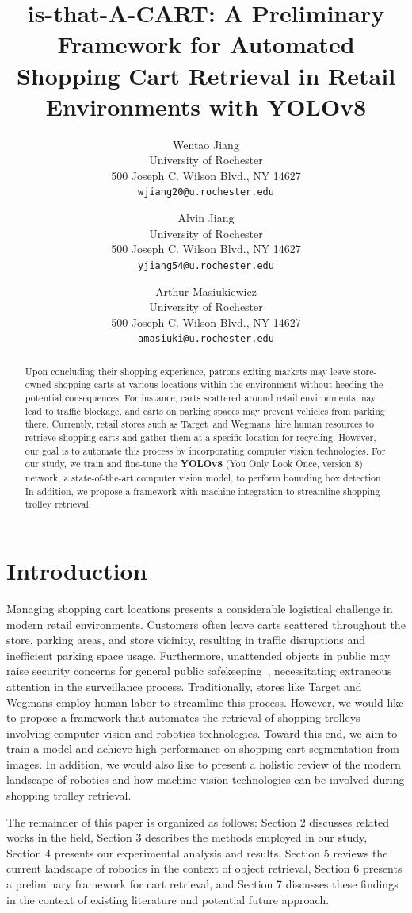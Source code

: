 \documentclass[10pt,twocolumn,letterpaper]{article}
\title{is-that-A-CART: A Preliminary Framework for Automated Shopping Cart Retrieval in Retail Environments with YOLOv8}
\author{Wentao Jiang\\
University of Rochester\\
500 Joseph C. Wilson Blvd., NY 14627\\
{\tt\small wjiang20@u.rochester.edu}
\and
Alvin Jiang\\
University of Rochester\\
500 Joseph C. Wilson Blvd., NY 14627\\
{\tt\small yjiang54@u.rochester.edu}
\and
Arthur Masiukiewicz\\
University of Rochester\\
500 Joseph C. Wilson Blvd., NY 14627\\
{\tt\small amasiuki@u.rochester.edu}
}
\begin{document}
\maketitle

\begin{abstract}
Upon concluding their shopping experience, patrons exiting markets may leave store-owned shopping carts at various locations within the environment without heeding the potential consequences. For instance, carts scattered around retail environments may lead to traffic blockage, and carts on parking spaces may prevent vehicles from parking there. Currently, retail stores such as Target\raisebox{1pt}{\textregistered}\ and Wegmans\raisebox{1pt}{\textregistered}\ hire human resources to retrieve shopping carts and gather them at a specific location for recycling. However, our goal is to automate this process by incorporating computer vision technologies. For our study, we train and fine-tune the \textbf{YOLOv8} (You Only Look Once, version 8) network, a state-of-the-art computer vision model, to perform bounding box detection. In addition, we propose a framework with machine integration to streamline shopping trolley retrieval.
\end{abstract}

\section{Introduction}
Managing shopping cart locations presents a considerable logistical challenge in modern retail environments. Customers often leave carts scattered throughout the store, parking areas, and store vicinity, resulting in traffic disruptions and inefficient parking space usage. Furthermore, unattended objects in public may raise security concerns for general public safekeeping~\cite{abandoned-cart}, necessitating extraneous attention in the surveillance process. Traditionally, stores like Target and Wegmans employ human labor to streamline this process. However, we would like to propose a framework that automates the retrieval of shopping trolleys involving computer vision and robotics technologies. Toward this end, we aim to train a model and achieve high performance on shopping cart segmentation from images. In addition, we would also like to present a holistic review of the modern landscape of robotics and how machine vision technologies can be involved during shopping trolley retrieval.

The remainder of this paper is organized as follows: Section 2 discusses related works in the field, Section 3 describes the methods employed in our study, Section 4 presents our experimental analysis and results, Section 5 reviews the current landscape of robotics in the context of object retrieval, Section 6 presents a preliminary framework for cart retrieval, and Section 7 discusses these findings in the context of existing literature and potential future approach. 
\end{document}

